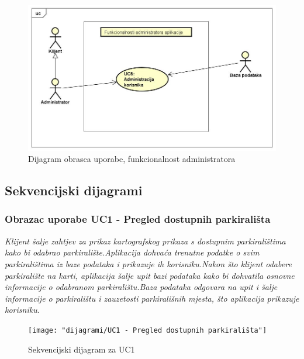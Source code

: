 \begin{figure}
	\centering
	\includegraphics[width=1\linewidth]{dijagrami/dijagramAdmin}
	\caption{Dijagram obrasca uporabe, funkcionalnost administratora}
	\label{fig:dijagramadmin}
\end{figure}

\newpage
	
\subsection{Sekvencijski dijagrami}

\subsubsection{Obrazac uporabe UC1 - Pregled dostupnih parkirališta}

\textit{Klijent šalje zahtjev za prikaz kartografskog prikaza s dostupnim parkiralištima kako bi odabrao parkiralište.Aplikacija dohvaća trenutne podatke o svim parkiralištima iz baze podataka i prikazuje ih korisniku.Nakon što klijent odabere parkiralište na karti, aplikacija šalje upit bazi podataka kako bi dohvatila osnovne informacije o odabranom parkiralištu.Baza podataka odgovara na upit i šalje informacije o parkiralištu i zauzetosti parkirališnih mjesta, što aplikacija prikazuje korisniku.}

\newpage

\begin{figure}
	\centering
	\texttt{[image: "dijagrami/UC1 - Pregled dostupnih parkirališta"]}
	\caption{Sekvencijski dijagram za UC1}
	\label{fig:uc1---pregled-dostupnih-parkiralista}
\end{figure}


